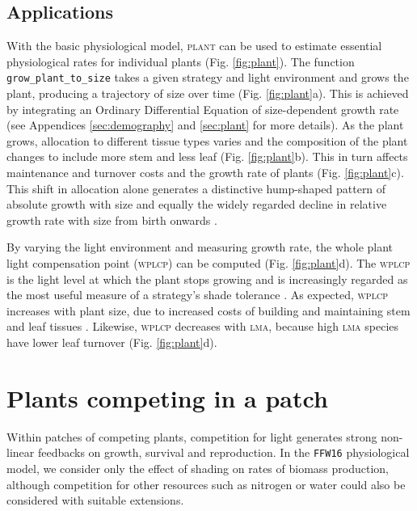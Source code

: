 \documentclass[a4paper,11pt]{article}
\newcommand{\plant}{\textsc{plant}}
\begin{document}
\subsection{Applications}

With the basic physiological model, {\plant} can be used to estimate
essential physiological rates for individual plants
(Fig. \ref{fig:plant}). The function \texttt{grow\_plant\_to\_size}
takes a given strategy and light environment and grows the plant,
producing a trajectory of size over time (Fig. \ref{fig:plant}a). This
is achieved by integrating an Ordinary Differential Equation of
size-dependent growth rate (see Appendices \ref{sec:demography} and
\ref{sec:plant} for more details). As the plant grows, allocation to
different tissue types varies and the composition of the plant
changes to include more stem and less leaf
(Fig. \ref{fig:plant}b). This in turn affects maintenance and turnover
costs and the growth rate of plants (Fig. \ref{fig:plant}c).  This
shift in allocation alone generates a distinctive hump-shaped pattern
of absolute growth with size \citep{King-2011} and equally the widely
regarded decline in relative growth rate with size from birth onwards
\citep{Enquist-2007}.

By varying the light environment and measuring growth rate, the whole
plant light compensation point (\textsc{wplcp}) can be computed (Fig.
\ref{fig:plant}d). The \textsc{wplcp} is the light level at which the plant 
stops growing and is increasingly regarded as the most useful
measure of a strategy's shade tolerance
\citep{Givnish-1988, Baltzer-2007, Lusk-2013}. As expected, \textsc{wplcp}
increases with plant size, due to increased costs of building and
maintaining stem and leaf tissues \citep{Givnish-1988}. Likewise, \textsc{wplcp}
decreases with \textsc{lma}, because high \textsc{lma} species have lower leaf turnover
\citep{Baltzer-2007, Lusk-2013} (Fig.
\ref{fig:plant}d).

\section{Plants competing in a patch}

Within patches of competing plants, competition for light generates
strong non-linear feedbacks on growth, survival and reproduction. In the
\texttt{FFW16} physiological model, we consider only the effect of
shading on rates of biomass production, although competition for other
resources such as nitrogen or water could also be considered with
suitable extensions.
\end{document}
